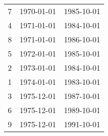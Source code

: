 % 
\begin{tabular}{ccc}
  \hline
  \hline
7 & 1970-01-01 & 1985-10-01 \\ 
  4 & 1971-01-01 & 1984-10-01 \\ 
  8 & 1971-01-01 & 1986-10-01 \\ 
  5 & 1972-01-01 & 1985-10-01 \\ 
  2 & 1973-01-01 & 1984-10-01 \\ 
  1 & 1974-01-01 & 1983-10-01 \\ 
  3 & 1975-12-01 & 1987-10-01 \\ 
  6 & 1975-12-01 & 1989-10-01 \\ 
  9 & 1975-12-01 & 1991-10-01 \\ 
   \hline
\end{tabular}

